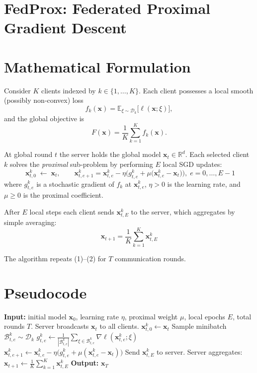 \documentclass{article}
\begin{document}
\section*{FedProx: Federated Proximal Gradient Descent}

\section*{Mathematical Formulation}
Consider $K$ clients indexed by $k\in\{1,\dots,K\}$.  
Each client possesses a local smooth (possibly non‑convex) loss 
\[
f_k(\mathbf{x})=\mathbb{E}_{\xi\sim\mathcal{D}_k}\big[\ell(\mathbf{x};\xi)\big],
\]
and the global objective is 
\[
F(\mathbf{x})=\frac1K\sum_{k=1}^K f_k(\mathbf{x}).
\]

At global round $t$ the server holds the global model $\mathbf{x}_t\in\mathbb{R}^d$.  
Each selected client $k$ solves the \emph{proximal} sub‑problem by performing $E$ local SGD updates:
\[
\boxed{\;
\mathbf{x}^{k}_{t,0}\;\leftarrow\;\mathbf{x}_t,\qquad
\mathbf{x}^{k}_{t,e+1}
   = \mathbf{x}^{k}_{t,e}
     -\eta\Big(
          g_{t,e}^{k}
          +\mu\big(\mathbf{x}^{k}_{t,e}-\mathbf{x}_t\big)
        \Big),\;
e=0,\dots,E-1
}
\tag{1}
\]
where $g_{t,e}^{k}$ is a stochastic gradient of $f_k$ at $\mathbf{x}^{k}_{t,e}$,
$\eta>0$ is the learning rate, and $\mu\ge0$ is the proximal coefficient.

After $E$ local steps each client sends $\mathbf{x}^{k}_{t,E}$ to the server,
which aggregates by simple averaging:
\[
\boxed{\;
\mathbf{x}_{t+1}= \frac1K\sum_{k=1}^{K}\mathbf{x}^{k}_{t,E}
\;}
\tag{2}
\]

The algorithm repeats (1)–(2) for $T$ communication rounds.

\section*{Pseudocode}
\begin{algorithm}[H]
\caption{FedProx}
\begin{algorithmic}[1]
\STATE \textbf{Input:} initial model $\mathbf{x}_0$, learning rate $\eta$, proximal weight $\mu$, local epochs $E$, total rounds $T$.
    \STATE Server broadcasts $\mathbf{x}_t$ to all clients.
        \STATE $\mathbf{x}^{k}_{t,0}\gets\mathbf{x}_t$
            \STATE Sample minibatch $\mathcal{B}_{t,e}^k\sim\mathcal{D}_k$
            \STATE $g_{t,e}^{k}\gets \frac{1}{|\mathcal{B}_{t,e}^k|}\sum_{\xi\in\mathcal{B}_{t,e}^k}\nabla\ell(\mathbf{x}^{k}_{t,e};\xi)$
            \STATE $\mathbf{x}^{k}_{t,e+1}\gets \mathbf{x}^{k}_{t,e}
                     -\eta\big(g_{t,e}^{k}+\mu(\mathbf{x}^{k}_{t,e}-\mathbf{x}_t)\big)$
        \ENDFOR
        \STATE Send $\mathbf{x}^{k}_{t,E}$ to server.
    \ENDFOR
    \STATE Server aggregates: $\displaystyle\mathbf{x}_{t+1}\gets\frac{1}{K}\sum_{k=1}^{K}\mathbf{x}^{k}_{t,E}$
\ENDFOR
\STATE \textbf{Output:} $\mathbf{x}_T$
\end{algorithmic}
\end{algorithm}
\end{document}
